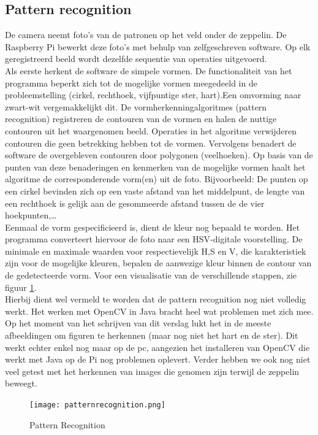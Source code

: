 \documentclass[eind]{penoverslag}
\begin{document}
\subsection{Pattern recognition}
De camera neemt foto’s van de patronen op het veld onder de zeppelin. De Raspberry Pi bewerkt deze foto’s met behulp van zelfgeschreven software. Op elk geregistreerd beeld wordt dezelfde sequentie van operaties uitgevoerd. \\
Als eerste herkent de software de simpele vormen. De functionaliteit van het programma beperkt zich tot de mogelijke vormen meegedeeld in de probleemstelling (cirkel, rechthoek, vijfpuntige ster, hart).Een omvorming naar zwart-wit vergemakkelijkt dit. De vormherkenningalgoritmes (pattern recognition) registreren de contouren van de vormen en halen de nuttige contouren uit het waargenomen beeld. Operaties in het algoritme verwijderen contouren die geen betrekking hebben tot de vormen. Vervolgens benadert de software de overgebleven contouren door polygonen (veelhoeken). Op basis van de punten van deze benaderingen en kenmerken van de mogelijke vormen haalt het algoritme de corresponderende vorm(en) uit de foto. Bijvoorbeeld: De punten op een cirkel bevinden zich op een vaste afstand van het middelpunt, de lengte van een rechthoek is gelijk aan de gesommeerde afstand tussen de de vier hoekpunten,\ldots \\
Eenmaal de vorm gespecificieerd is, dient de kleur nog bepaald te worden.  Het programma converteert hiervoor de foto naar een HSV-digitale voorstelling. De minimale en maximale waarden voor respectievelijk H,S en V, die karakteristiek zijn voor de mogelijke kleuren, bepalen de aanwezige kleur binnen de contour van de gedetecteerde vorm. Voor een visualisatie van de verschillende stappen, zie figuur \ref{Patterns}. \\

Hierbij dient wel vermeld te worden dat de pattern recognition nog niet volledig werkt. Het werken met OpenCV in Java bracht heel wat problemen met zich mee. Op het moment van het schrijven van dit verslag lukt het in de meeste afbeeldingen om figuren te herkennen (maar nog niet het hart en de ster). Dit werkt echter enkel nog maar op de pc, aangezien het installeren van OpenCV die werkt met Java op de Pi nog problemen oplevert. Verder hebben we ook nog niet veel getest met het herkennen van images die genomen zijn terwijl de zeppelin beweegt.

\begin{figure}[H]
\begin{center}
\texttt{[image: patternrecognition.png]}
\end{center}
\caption{Pattern Recognition}
\label{Patterns}
\end{figure}
\end{document}
